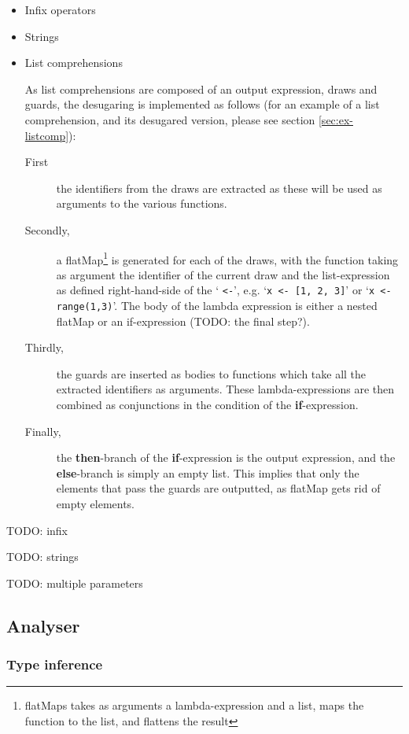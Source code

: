 \begin{itemize}
  \item Infix operators
  \item Strings
  \item List comprehensions
    
    As list comprehensions are composed of an output expression, draws and guards, the desugaring is implemented as follows (for an example of a list comprehension, and its desugared version,  please see section \ref{sec:ex-listcomp}):
    \begin{description}
      \item[First] the identifiers from the draws are extracted as these will be used as arguments to the various functions.
      \item[Secondly,] a flatMap\footnote{flatMaps takes as arguments a lambda-expression and a list, maps the function to the list, and flattens the result} is generated for each of the draws, with the function taking as argument the identifier of the current draw and the list-expression as defined right-hand-side of the ` \texttt{<-}', e.g. `\texttt{x <- [1, 2, 3]}' or `\texttt{x <- range(1,3)}'. The body of the lambda expression is either a nested flatMap or an if-expression (TODO: the final step?).
        \item[Thirdly,] the guards are inserted as bodies to functions which take all the extracted identifiers as arguments. These lambda-expressions are then combined as conjunctions in the condition of the \textbf{if}-expression.
      \item[Finally,] the \textbf{then}-branch of the \textbf{if}-expression is the output expression, and the \textbf{else}-branch is simply an empty list. This implies that only the elements that pass the guards are outputted, as flatMap gets rid of empty elements.
    \end{description}

    
\end{itemize}

TODO: infix

TODO: strings

TODO: multiple parameters

\subsection{Analyser}

\subsubsection{Type inference}


